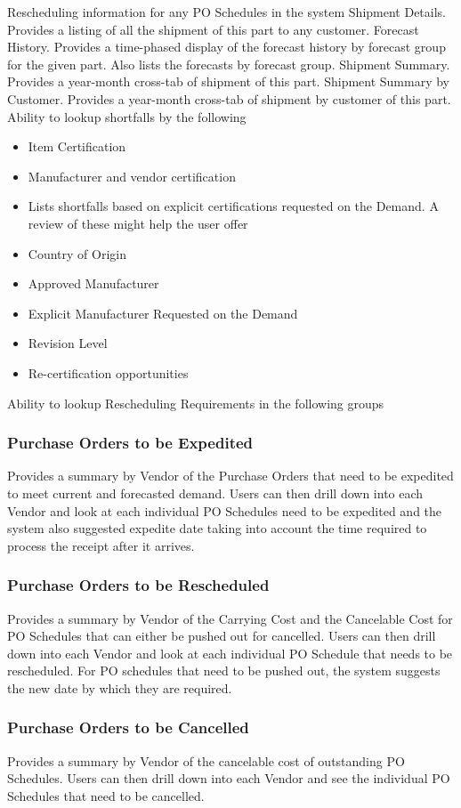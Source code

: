 Rescheduling information for any PO Schedules in the system
Shipment Details. Provides a listing of all the shipment of this part to any customer.
Forecast History. Provides a time-phased display of the forecast history by forecast group for the given part. Also lists the forecasts by forecast group.
Shipment Summary. Provides a year-month cross-tab of shipment of this part.
Shipment Summary by Customer. Provides a year-month cross-tab of shipment by customer of this part.
Ability to lookup shortfalls by the following
\begin{itemize}
\item Item Certification
\item Manufacturer and vendor certification 
\item Lists shortfalls based on explicit certifications requested on the Demand. A review of these might help the user offer 
\item Country of Origin
\item Approved Manufacturer
\item Explicit Manufacturer Requested on the Demand
\item Revision Level
\item Re-certification opportunities
\end{itemize}

Ability to lookup Rescheduling Requirements in the following groups
\subsubsection{Purchase Orders to be Expedited}
Provides a summary by Vendor of the Purchase Orders that need to be expedited to meet current and forecasted demand. Users can then drill down into each Vendor and look at each individual PO Schedules need to be expedited and the system also suggested expedite date taking into account the time required to process the receipt after it arrives.
\subsubsection{Purchase Orders to be Rescheduled}
Provides a summary by Vendor of the Carrying Cost and the Cancelable Cost for PO Schedules that can either be pushed out for cancelled. Users can then drill down into each Vendor and look at each individual PO Schedule that needs to be rescheduled. For PO schedules that need to be pushed out, the system suggests the new date by which they are required.
\subsubsection{Purchase Orders to be Cancelled}
Provides a summary by Vendor of the cancelable cost of outstanding PO Schedules. Users can then drill down into each Vendor and see the individual PO Schedules that need to be cancelled.





